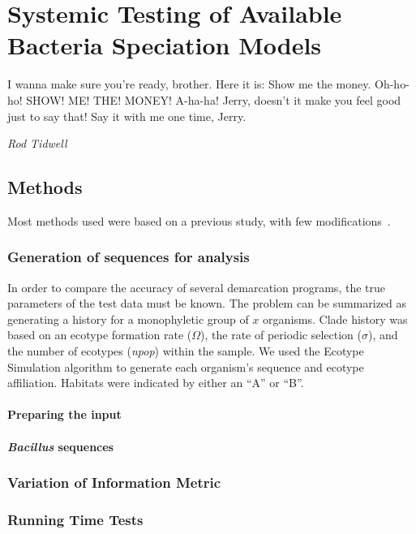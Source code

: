 \chapter{Systemic Testing of Available Bacteria Speciation Models}

\begin{shadequote}
I wanna make sure you're ready, brother. Here it is: Show me the money. Oh-ho-ho! SHOW! ME! THE! MONEY! A-ha-ha! Jerry, doesn't it make you feel good just to say that! Say it with me one time, Jerry. \par\emph{Rod Tidwell}
\end{shadequote}


\section{Methods}
Most methods used were based on a previous study, with few modifications~\cite{carlo}.
\subsection{Generation of sequences for analysis}
In order to compare the accuracy of several demarcation programs, the true parameters of the test data must be known.
The problem can be summarized as generating a history for a monophyletic group of $x$ organisms.
Clade history was based on an ecotype formation rate ($\Omega$), the rate of periodic selection ($\sigma$), and the number of ecotypes (\emph{npop}) within the sample.
We used the Ecotype Simulation algorithm to generate each organism's sequence and ecotype affiliation.
Habitats were indicated by either an ``A'' or ``B''.

\subsubsection{Preparing the input}


\subsubsection{\emph{Bacillus} sequences}
\subsection{Variation of Information Metric}
\subsection{Running Time Tests}
